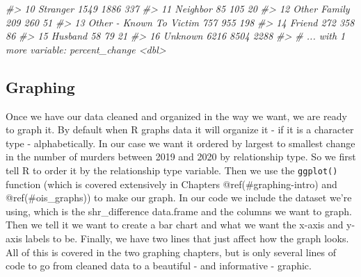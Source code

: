 \documentclass[
]{krantz}
\makeatletter
\newenvironment{Shaded}{\begin{snugshade}}{\end{snugshade}}
\newcommand{\CommentTok}[1]{\textcolor[rgb]{0.37,0.37,0.37}{\textit{#1}}}
\newenvironment{kframe}{%
\medskip{}
\setlength{\fboxsep}{.8em}
 \def\at@end@of@kframe{}%
 \ifinner\ifhmode%
  \def\at@end@of@kframe{\end{minipage}}%
  \begin{minipage}{\columnwidth}%
 \fi\fi%
 \def\FrameCommand##1{\hskip\@totalleftmargin \hskip-\fboxsep
 \colorbox{shadecolor}{##1}\hskip-\fboxsep
     \hskip-\linewidth \hskip-\@totalleftmargin \hskip\columnwidth}%
 \MakeFramed {\advance\hsize-\width
   \@totalleftmargin\z@ \linewidth\hsize
   \@setminipage}}%
 {\par\unskip\endMakeFramed%
 \at@end@of@kframe}
\renewenvironment{Shaded}{\begin{kframe}}{\end{kframe}}
\makeatother
\begin{document}
\begin{Shaded}
\begin{Highlighting}[]
\CommentTok{\#\textgreater{} 10 Stranger                          1549   1886        337}
\CommentTok{\#\textgreater{} 11 Neighbor                            85    105         20}
\CommentTok{\#\textgreater{} 12 Other Family                       209    260         51}
\CommentTok{\#\textgreater{} 13 Other {-} Known To Victim            757    955        198}
\CommentTok{\#\textgreater{} 14 Friend                             272    358         86}
\CommentTok{\#\textgreater{} 15 Husband                             58     79         21}
\CommentTok{\#\textgreater{} 16 Unknown                           6216   8504       2288}
\CommentTok{\#\textgreater{} \# ... with 1 more variable: percent\_change \textless{}dbl\textgreater{}}
\end{Highlighting}
\end{Shaded}

\hypertarget{graphing}{%
\subsection{Graphing}\label{graphing}}

Once we have our data cleaned and organized in the way we want, we are ready to graph it. By default when R graphs data it will organize it - if it is a character type - alphabetically. In our case we want it ordered by largest to smallest change in the number of murders between 2019 and 2020 by relationship type. So we first tell R to order it by the relationship type variable. Then we use the \texttt{ggplot()} function (which is covered extensively in Chapters @ref(\#graphing-intro) and @ref(\#ois\_graphs)) to make our graph. In our code we include the dataset we're using, which is the shr\_difference data.frame and the columns we want to graph. Then we tell it we want to create a bar chart and what we want the x-axis and y-axis labels to be. Finally, we have two lines that just affect how the graph looks. All of this is covered in the two graphing chapters, but is only several lines of code to go from cleaned data to a beautiful - and informative - graphic.
\end{document}
